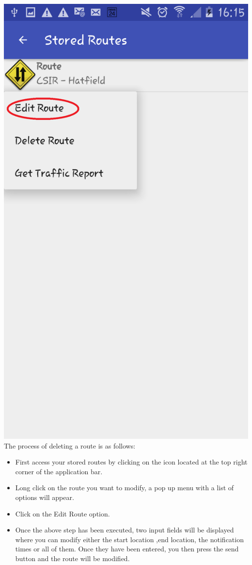 \documentclass[a4paper,12pt]{article}
\begin{document}
\includegraphics[width=\textwidth]{images/EditOption.png}
The process of deleting a route is as follows:
\begin{itemize}
    \item First access your stored routes by  clicking on the icon located at the top right corner of the application bar. 
    \item Long click on the route you want to modify, a pop up menu with a list of options will appear.
    \item Click on the Edit Route option.
    \item Once the above step has been executed, two input fields will be displayed  where you can modify either the start location ,end location, the notification times  or all of them. Once they have been entered, you then press the send button and the route will be modified.
\end{itemize}
\end{document}
